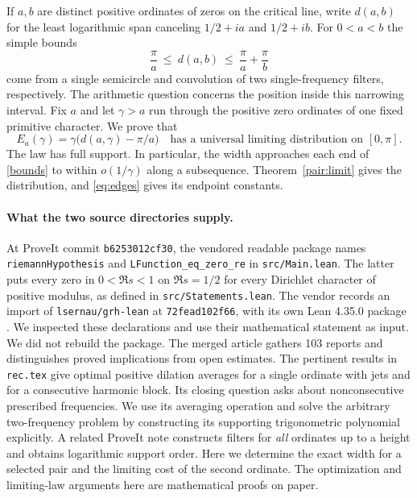 \documentclass[11pt,letterpaper]{article}
\theoremstyle{remark}\newtheorem{remark}[theorem]{Remark}
\newcommand{\pinned}{\texttt{b6253012cf30}}
\begin{document}
If $a,b$ are distinct positive ordinates of zeros on the critical line, write
$d(a,b)$ for the least logarithmic span canceling $1/2+ia$ and $1/2+ib$.
For $0<a<b$ the simple bounds
\begin{equation}\label{bounds}
 \frac{\pi}{a}\ \le\ d(a,b)\ \le\ \frac{\pi}{a}+\frac{\pi}{b}
\end{equation}
come from a single semicircle and convolution of two single-frequency
filters, respectively. The arithmetic question concerns the position inside
this narrowing interval. Fix $a$ and let $\gamma>a$ run through the
positive zero ordinates of one fixed primitive character. We prove that
\begin{equation}\label{leading}
 E_a(\gamma)=\gamma\bigl(d(a,\gamma)-\pi/a\bigr)
 \quad\text{has a universal limiting distribution on }[0,\pi].
\end{equation}
The law has full support. In particular, the width approaches each end of
\eqref{bounds} to within $o(1/\gamma)$ along a subsequence.
Theorem~\ref{pair:limit} gives the distribution, and \eqref{eq:edges} gives its endpoint constants.

\paragraph{What the two source directories supply.}
At ProveIt commit \pinned, the vendored readable package names
\texttt{riemannHypothesis} and \texttt{LFunction\_eq\_zero\_re} in
\texttt{src/Main.lean}. The latter puts every zero in $0<\Re s<1$
on $\Re s=1/2$ for every Dirichlet character of positive modulus, as defined
in \texttt{src/Statements.lean}. The vendor records an import of
\texttt{lsernau/grh-lean} at \texttt{72fead102f66}, with its own Lean 4.35.0
package \cite{Vendor}. We inspected these declarations and use their mathematical statement
as input. We did not rebuild the package. The merged article
\cite{Article} gathers 103 reports and distinguishes proved implications
from open estimates. The pertinent results in \texttt{rec.tex} give optimal
positive dilation averages for a single ordinate with jets and for a
consecutive harmonic block. Its closing question asks about nonconsecutive
prescribed frequencies. We use its averaging operation and solve the
arbitrary two-frequency problem by constructing its supporting trigonometric
polynomial explicitly. A related ProveIt note \cite{Nearby} constructs filters for \emph{all}
ordinates up to a height and obtains logarithmic support order. Here we
determine the exact width for a selected pair and the limiting cost of the
second ordinate. The optimization and limiting-law arguments here are
mathematical proofs on paper.
\end{document}

